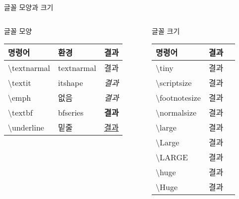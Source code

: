 \documentclass[ aspectratio=149,  14pt,blue,xcolor=pdftex,dvipsnames,table,handout,notes]{beamer}
\begin{document}





		\begin{frame}[t]{글꼴 모양과 크기}

			\begin{columns}[t]
			\begin{column}{.5\textwidth}
					\begin{block}{글꼴 모양}
					\begin{table}
					\begin{tabular}{ l l l  }
					명령어	&환경	&결과\\
					\hline
					\textbackslash textnarmal 	&textnarmal 	&\textnormal{결과}\\
					\textbackslash textit 		&itshape		&\textit{결과}\\
					\textbackslash emph 		&없음		&\emph{결과}\\
					\textbackslash textbf 		&bfseries		&\textbf{결과}\\
					\textbackslash underline 	&밑줄		&\underline{결과}\\
					\end{tabular}
					\end{table}
					\end{block}
			\end{column}
			\begin{column}{.5\textwidth}
					\begin{block}{글꼴 크기}
					\begin{tabular}{ l l l  }
					명령어		&결과\\
					\hline
					\textbackslash tiny			&\tiny{결과}\\
					\textbackslash scriptsize		&\scriptsize{결과}\\
					\textbackslash footnotesize		&\footnotesize{결과}\\
					\textbackslash normalsize		&\normalsize{결과}\\
					\textbackslash large			&\large{결과}\\
					\textbackslash Large			&\Large{결과}\\
					\textbackslash LARGE			&\LARGE{결과}\\
					\textbackslash huge			&\huge{결과}\\
					\textbackslash Huge			&\Huge{결과}\\
					\end{tabular}
					\end{block}
			\end{column}
			\end{columns}


		\end{frame}
\end{document}
